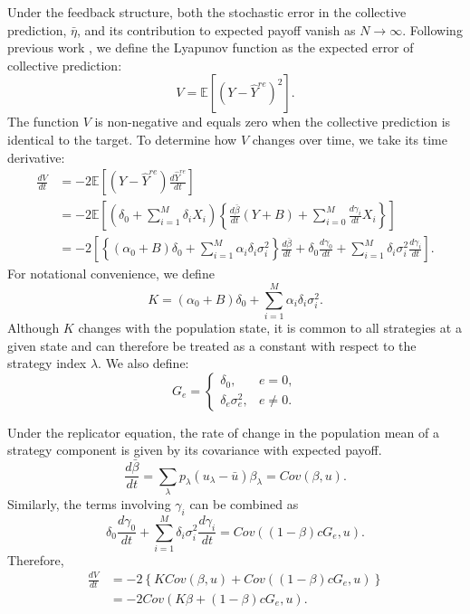 \documentclass[12pt]{article}
\begin{document}
Under the feedback structure, both the stochastic error in the collective prediction, $\bar{\eta}$, and its contribution to expected payoff vanish as $N\to\infty$. 
Following previous work \citep{wang2025individual}, we define the Lyapunov function as the expected error of collective prediction: 
\begin{equation}
V = \mathbb{E}\left[(Y-\hat{Y}^{re})^2\right].
\end{equation}
The function $V$ is non-negative and equals zero when the collective prediction is identical to the target. 
To determine how $V$ changes over time, we take its time derivative:
\begin{align}
\frac{dV}{dt}
&= -2\mathbb{E}\left[(Y-\hat{Y}^{re})\frac{d\hat{Y}^{re}}{dt}\right] \\
&= -2\mathbb{E}\left[(\delta_0+\sum_{i=1}^{M}\delta_iX_i)
\left\{\frac{d\bar{\beta}}{dt}(Y+B)+\sum_{i=0}^{M}\frac{d\gamma_i}{dt}X_i\right\}\right] \\
&= -2\left[\left\{(\alpha_0+B)\delta_0+\sum_{i=1}^{M}\alpha_i\delta_i\sigma_i^2\right\}\frac{d\bar{\beta}}{dt}
+\delta_0\frac{d\gamma_0}{dt}
+\sum_{i=1}^{M}\delta_i\sigma_i^2\frac{d\gamma_i}{dt}\right].
\end{align}
For notational convenience, we define
\begin{equation}
K = (\alpha_0+B)\delta_0+\sum_{i=1}^{M}\alpha_i\delta_i\sigma_i^2.
\end{equation}
Although $K$ changes with the population state, it is common to all strategies at a given state and can therefore be treated as a constant with respect to the strategy index $\lambda$.
We also define:
\begin{equation}
G_e =
\begin{cases}
\delta_0, & e=0,\\
\delta_e\sigma_e^2, & e\neq0.
\end{cases}
\end{equation}

Under the replicator equation, the rate of change in the population mean of a strategy component is given by its covariance with expected payoff. 
\begin{equation}
\frac{d\bar{\beta}}{dt} = \sum_\lambda p_\lambda(u_\lambda-\bar{u})\beta_\lambda = Cov(\beta,u).
\end{equation}
Similarly, the terms involving $\gamma_i$ can be combined as
\begin{equation}
\delta_0\frac{d\gamma_0}{dt} + \sum_{i=1}^{M}\delta_i\sigma_i^2\frac{d\gamma_i}{dt}
= Cov((1-\beta)cG_e,u).
\end{equation}
Therefore,
\begin{align}
\frac{dV}{dt}
&= -2\left\{KCov(\beta,u)+Cov((1-\beta)cG_e,u)\right\} \\
&= -2Cov(K\beta+(1-\beta)cG_e,u).
\end{align}
\end{document}
